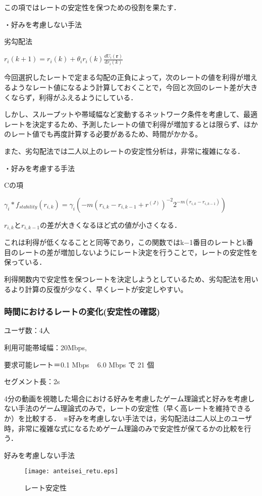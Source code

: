 \documentclass[rinkou,a4paper,uplatex]{ieicej}
\begin{document}
この項ではレートの安定性を保つための役割を果たす．

・好みを考慮しない手法

  劣勾配法

$r_i(k+1)=r_i(k)+θ_ir_i(k)\frac{dU_i(\mathbf{r})}{dr_i(k)}$

今回選択したレートで定まる勾配の正負によって，次のレートの値を利得が増えるようなレート値になるよう計算しておくことで，今回と次回のレート差が大きくならず，利得がふえるようにしている．

しかし、スループットや帯域幅など変動するネットワーク条件を考慮して、最適レートを決定するため、予測したレートの値で利得が増加するとは限らず、ほかのレート値でも再度計算する必要があるため、時間がかかる。

また、劣勾配法では二人以上のレートの安定性分析は，非常に複雑になる．


・好みを考慮する手法

 Cの項
 
${\gamma_i*f_{stability}(r_{i,k})}=\gamma_i(-m(r_{i,k}-r_{i,k-1}+r^{(J)})^{-2}2^{-m(r_{i,k}-r_{i,k-1})})$

$r_{i,k}$と$r_{i,k-1}$の差が大きくなるほど式の値が小さくなる．

これは利得が低くなることと同等であり，この関数ではk−1番目のレートとk番目のレートの差が増加しないようにレート決定を行うことで，レートの安定性を保っている．

利得関数内で安定性を保つレートを決定しようとしているため、劣勾配法を用いるより計算の反復が少なく、早くレートが安定しやすい。

\subsubsection{時間におけるレートの変化(安定性の確認)}

ユーザ数：4人

利用可能帯域幅：20Mbps,

要求可能レート＝0.1 Mbps ~ 6.0 Mbps で 21 個

セグメント長：2s

4分の動画を視聴した場合における好みを考慮したゲーム理論式と好みを考慮しない手法のゲーム理論式のみで，レートの安定性（早く高レートを維持できるか）を比較する．
※好みを考慮しない手法では，劣勾配法は二人以上のユーザ時，非常に複雑な式になるためゲーム理論のみで安定性が保てるかの比較を行う．

好みを考慮しない手法
\begin{figure}[hh]
\centering
\texttt{[image: anteisei\_retu.eps]}
\caption{レート安定性}
\end{figure}
\end{document}
